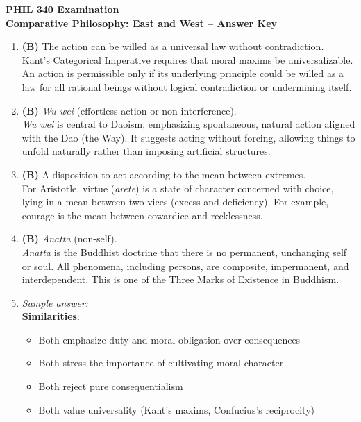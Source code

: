 \documentclass[11pt]{article}
\begin{document}
\begin{center}
  {\Large \textbf{PHIL 340 Examination}}\\[0.25em]
  {\large \textbf{Comparative Philosophy: East and West -- Answer Key}}\\[0.5em]
\end{center}

\begin{enumerate}[label=\textbf{\arabic*.}]

  \item \textbf{(B)} The action can be willed as a universal law without contradiction.\\
  Kant's Categorical Imperative requires that moral maxims be universalizable. An action is 
  permissible only if its underlying principle could be willed as a law for all rational beings 
  without logical contradiction or undermining itself.

  \item \textbf{(B)} \textit{Wu wei} (effortless action or non-interference).\\
  \textit{Wu wei} is central to Daoism, emphasizing spontaneous, natural action aligned with the 
  Dao (the Way). It suggests acting without forcing, allowing things to unfold naturally rather 
  than imposing artificial structures.

  \item \textbf{(B)} A disposition to act according to the mean between extremes.\\
  For Aristotle, virtue (\textit{arete}) is a state of character concerned with choice, lying in 
  a mean between two vices (excess and deficiency). For example, courage is the mean between 
  cowardice and recklessness.

  \item \textbf{(B)} \textit{Anatta} (non-self).\\
  \textit{Anatta} is the Buddhist doctrine that there is no permanent, unchanging self or soul. 
  All phenomena, including persons, are composite, impermanent, and interdependent. This is one 
  of the Three Marks of Existence in Buddhism.

  \item \emph{Sample answer:}\\
  \textbf{Similarities}:
  \begin{itemize}
    \item Both emphasize duty and moral obligation over consequences
    \item Both stress the importance of cultivating moral character
    \item Both reject pure consequentialism
    \item Both value universality (Kant's maxims, Confucius's reciprocity)
  \end{itemize}


\end{enumerate}
\end{document}
